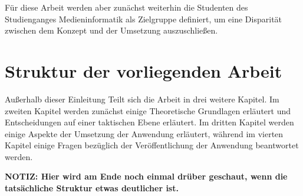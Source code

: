 Für diese Arbeit werden aber zunächst weiterhin die Studenten des Studienganges Medieninformatik als Zielgruppe definiert, um eine Disparität zwischen dem Konzept und der Umsetzung auszuschließen.

\section{Struktur der vorliegenden Arbeit}
Außerhalb dieser Einleitung Teilt sich die Arbeit in drei weitere Kapitel. Im zweiten Kapitel werden zunächst einige Theoretische Grundlagen erläutert und Entscheidungen auf einer taktischen Ebene erläutert. Im dritten Kapitel werden einige Aspekte der Umsetzung der Anwendung erläutert, während im vierten Kapitel einige Fragen bezüglich der Veröffentlichung der Anwendung beantwortet werden.

\textbf{NOTIZ: Hier wird am Ende noch einmal drüber geschaut, wenn die tatsächliche Struktur etwas deutlicher ist.}
